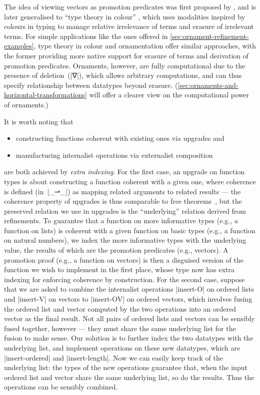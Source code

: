 The idea of viewing vectors as promotion predicates was first proposed by \citet[page~82]{Bernardy-thesis}, and is later generalised to ``type theory in colour'' \citep{Bernardy-color}, which uses modalities inspired by colours in typing to manage relative irrelevance of terms and erasure of irrelevant terms.
For simple applications like the ones offered in \autoref{sec:ornament-refinement-examples}, type theory in colour and ornamentation offer similar approaches, with the former providing more native support for erasure of terms and derivation of promotion predicates.
Ornaments, however, are fully computational due to the presence of deletion~(|∇|), which allows arbitrary computations, and can thus specify relationship between datatypes beyond erasure.
(\autoref{sec:ornaments-and-horizontal-transformations} will offer a clearer view on the computational power of ornaments.)

It is worth noting that
\begin{itemize}
\item constructing functions coherent with existing ones via upgrades and
\item manufacturing internalist operations via externalist composition
\end{itemize}
are both achieved by \emph{extra indexing}.
For the first case, an upgrade on function types is about constructing a function coherent with a given one, where coherence is defined (in~|_⇀_|) as mapping related arguments to related results --- the coherence property of upgrades is thus comparable to free theorems~\citep{Wadler-theorems-for-free}, but the preserved relation we use in upgrades is the ``underlying'' relation derived from refinements.
To guarantee that a function on more informative types (e.g., a function on lists) is coherent with a given function on basic types (e.g., a function on natural numbers), we index the more informative types with the underlying value, the results of which are the promotion predicates (e.g., vectors).
A promotion proof (e.g., a function on vectors) is then a disguised version of the function we wish to implement in the first place, whose type now has extra indexing for enforcing coherence by construction.
For the second case, suppose that we are asked to combine the internalist operations |insert-O| on ordered lists and |insert-V| on vectors to |insert-OV| on ordered vectors, which involves fusing the ordered list and vector computed by the two operations into an ordered vector as the final result.
Not all pairs of ordered lists and vectors can be sensibly fused together, however --- they must share the same underlying list for the fusion to make sense.
Our solution is to further index the two datatypes with the underlying list, and implement operations on these new datatypes, which are |insert-ordered| and |insert-length|.
Now we can easily keep track of the underlying list: the types of the new operations guarantee that, when the input ordered list and vector share the same underlying list, so do the results.
Thus the operations can be sensibly combined.

